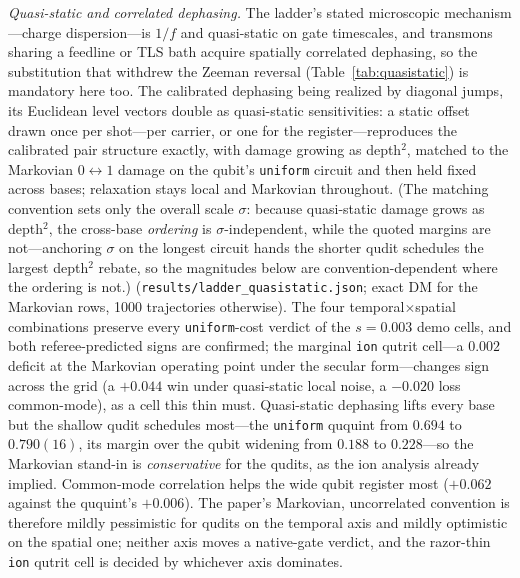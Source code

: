 \documentclass[aps,pra,reprint,superscriptaddress,nofootinbib,floatfix]{revtex4-2}
\begin{document}
\emph{Quasi-static and correlated dephasing.} The ladder's stated
microscopic mechanism---charge dispersion---is $1/f$ and quasi-static
on gate timescales, and transmons sharing a feedline or TLS bath
acquire spatially correlated dephasing, so the substitution that
withdrew the Zeeman reversal (Table~\ref{tab:quasistatic}) is
mandatory here too. The calibrated dephasing being realized by
diagonal jumps, its Euclidean level vectors double as quasi-static
sensitivities: a static offset drawn once per shot---per carrier, or
one for the register---reproduces the calibrated pair structure
exactly, with damage growing as depth$^2$, matched to the Markovian
$0{\leftrightarrow}1$ damage on the qubit's \texttt{uniform} circuit
and then held fixed across bases; relaxation stays local and
Markovian throughout. (The matching convention sets only the overall
scale $\sigma$: because quasi-static damage grows as depth$^2$, the
cross-base \emph{ordering} is $\sigma$-independent, while the quoted
margins are not---anchoring $\sigma$ on the longest circuit hands
the shorter qudit schedules the largest depth$^2$ rebate, so the
magnitudes below are convention-dependent where the ordering is
not.)
(\texttt{results/ladder\_quasistatic.json}; exact DM for the
Markovian rows, 1000 trajectories otherwise). The four
temporal$\times$spatial combinations preserve every
\texttt{uniform}-cost verdict of the
$s=0.003$ demo cells, and both referee-predicted signs are
confirmed; the marginal \texttt{ion} qutrit cell---a $0.002$
deficit at the Markovian operating point under the secular
form---changes sign across the grid (a $+0.044$ win under
quasi-static local noise, a $-0.020$ loss common-mode), as a cell
this thin must. Quasi-static dephasing lifts every base but the shallow
qudit schedules most---the \texttt{uniform} ququint from $0.694$ to
$0.790(16)$, its margin over the qubit widening from $0.188$ to
$0.228$---so the Markovian stand-in is \emph{conservative} for the
qudits, as the ion analysis already implied. Common-mode correlation
helps the wide qubit register most ($+0.062$ against the ququint's
$+0.006$). The paper's Markovian, uncorrelated
convention is therefore mildly pessimistic for qudits on the
temporal axis and mildly optimistic on the spatial one; neither
axis moves a native-gate verdict, and the razor-thin \texttt{ion}
qutrit cell is decided by whichever axis dominates.
\end{document}
